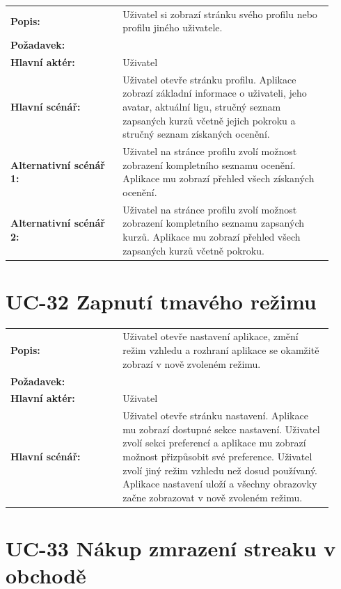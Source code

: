 \begin{tabular}{p{0.32\linewidth}p{0.6\linewidth}}
  \textbf{Popis:} & Uživatel si zobrazí stránku svého profilu nebo profilu jiného uživatele. \\
  \textbf{Požadavek:} & \nameref{sec:fp-user-profile} \\
  \textbf{Hlavní aktér:} & Uživatel \\
  \textbf{Hlavní scénář:} & Uživatel otevře stránku profilu. Aplikace zobrazí základní informace o uživateli, jeho avatar, aktuální ligu, stručný seznam zapsaných kurzů včetně jejich pokroku a stručný seznam získaných ocenění. \\
  \textbf{Alternativní scénář 1:} & Uživatel na stránce profilu zvolí možnost zobrazení kompletního seznamu ocenění. Aplikace mu zobrazí přehled všech získaných ocenění. \\
  \textbf{Alternativní scénář 2:} & Uživatel na stránce profilu zvolí možnost zobrazení kompletního seznamu zapsaných kurzů. Aplikace mu zobrazí přehled všech zapsaných kurzů včetně pokroku. \\
\end{tabular}

\section{UC-32 Zapnutí tmavého režimu}\label{sec:uc-32}

\begin{tabular}{p{0.32\linewidth}p{0.6\linewidth}}
  \textbf{Popis:} & Uživatel otevře nastavení aplikace, změní režim vzhledu a rozhraní aplikace se okamžitě zobrazí v nově zvoleném režimu. \\
  \textbf{Požadavek:} & \nameref{sec:fp-dark-mode} \\
  \textbf{Hlavní aktér:} & Uživatel \\
  \textbf{Hlavní scénář:} & Uživatel otevře stránku nastavení. Aplikace mu zobrazí dostupné sekce nastavení. Uživatel zvolí sekci preferencí a aplikace mu zobrazí možnost přizpůsobit své preference. Uživatel zvolí jiný režim vzhledu než dosud používaný. Aplikace nastavení uloží a všechny obrazovky začne zobrazovat v nově zvoleném režimu. \\
\end{tabular}

\section{UC-33 Nákup zmrazení streaku v obchodě}\label{sec:uc-33}

